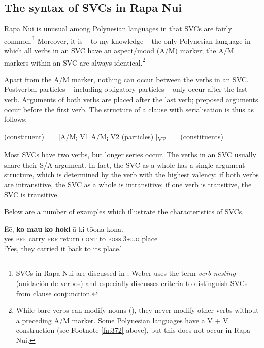 \subsection{The syntax of SVCs in Rapa Nui}\label{sec:7.7.2}

Rapa Nui is unusual among Polynesian languages in that SVCs are fairly common.\footnote{\label{fn:373}SVCs in Rapa Nui are discussed in \citet[67-75]{WeberR2003}; Weber uses the term \textit{verb nesting} (anidación de verbos) and especially discusses criteria to distinguish SVCs from clause conjunction.} Moreover, it is – to my knowledge – the only Polynesian language in which all verbs in an SVC have an aspect/mood (A/M) marker; the A/M markers within an SVC are always identical.\footnote{\label{fn:374}While bare verbs can modify nouns (), they never modify other verbs without a preceding A/M marker. Some Polynesian languages have a V + V construction (see Footnote \ref{fn:372} above), but this does not occur in Rapa Nui.}

Apart from the A/M marker, nothing can occur between the verbs in an SVC. Postverbal particles – including obligatory particles – only occur after the last verb. Arguments of both verbs are placed after the last verb; preposed arguments occur before the first verb. The structure of a clause with serialisation is thus as follows:

\ea\label{ex:7.170a}
(constituent) ~ ~ [A/M\textsubscript{i}   V1   A/M\textsubscript{i}   V2   (particles) ]\textsubscript{VP} ~ ~  (constituents)
\z

Most SVCs have two verbs, but longer series occur. The verbs in an SVC usually share their S/A argument. In fact, the SVC as a whole has a single argument structure, which is determined by the verb with the highest valency: if both verbs are intransitive, the SVC as a whole is intransitive; if one verb is transitive, the SVC is transitive.

Below are a number of examples which illustrate the characteristics of SVCs. 

\ea\label{ex:7.171}
\gll {\ꞌ}Ēē, \textbf{ko} \textbf{ma{\ꞌ}u} \textbf{ko} \textbf{hoki} {\ꞌ}ā ki tō{\ꞌ}ona kona. \\
yes \textsc{prf} carry \textsc{prf} return \textsc{cont} to \textsc{poss.3sg.o} place \\

\glt 
‘Yes, they carried it back to its place.’ \textstyleExampleref{[R413.844]} 
\z

